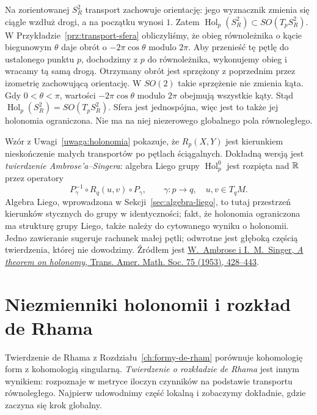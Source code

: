 \begin{przyklad}
\label{prz:holonomia-sfera}
Na zorientowanej $S_R^2$ transport zachowuje orientację:
jego wyznacznik zmienia się ciągle wzdłuż drogi,
a na początku wynosi $1$. Zatem
$\operatorname{Hol}_p(S_R^2)\subset SO(T_pS_R^2)$.
W Przykładzie~\ref{prz:transport-sfera} obliczyliśmy,
że obieg równoleżnika o kącie biegunowym $\theta$ daje obrót
o $-2\pi\cos\theta$ modulo $2\pi$. Aby przenieść tę
pętlę do ustalonego punktu $p$, dochodzimy z $p$ do
równoleżnika, wykonujemy obieg i wracamy tą samą drogą.
Otrzymany obrót jest sprzężony z poprzednim przez
izometrię zachowującą orientację. W $SO(2)$ takie
sprzężenie nie zmienia kąta. Gdy $0<\theta<\pi$,
wartości $-2\pi\cos\theta$ modulo $2\pi$ obejmują
wszystkie kąty. Stąd
$\operatorname{Hol}_p(S_R^2)=SO(T_pS_R^2)$.
Sfera jest jednospójna, więc jest to także jej
holonomia ograniczona. Nie ma na niej niezerowego
globalnego pola równoległego.
\end{przyklad}

\begin{uwaga}
\label{uwaga:ambrose-singer-holonomia}
Wzór z Uwagi~\ref{uwaga:holonomia} pokazuje, że
$R_p(X,Y)$ jest kierunkiem nieskończenie małych
transportów po pętlach ściągalnych. Dokładną wersją
jest \emph{twierdzenie Ambrose'a--Singera}:
algebra Liego grupy $\operatorname{Hol}^0_p$ jest
rozpięta nad $\mathbb{R}$ przez operatory
\[
 P_\gamma^{-1}\circ R_q(u,v)\circ P_\gamma,
 \qquad \gamma:p\longrightarrow q,\quad
 u,v\in T_qM.
\]
Algebra Liego, wprowadzona w Sekcji~\ref{sec:algebra-liego},
to tutaj przestrzeń kierunków stycznych do grupy
w identyczności; fakt, że holonomia ograniczona ma
strukturę grupy Liego, także należy do cytowanego
wyniku o holonomii. Jedno zawieranie sugeruje rachunek małej
pętli; odwrotne jest głęboką częścią twierdzenia, której
nie dowodzimy. Źródłem jest
\href{https://doi.org/10.1090/S0002-9947-1953-0063739-1}
{W.~Ambrose i I.~M.~Singer, \emph{A theorem on holonomy},
Trans. Amer. Math. Soc. 75 (1953), 428--443}.
\end{uwaga}

\section{Niezmienniki holonomii i rozkład de Rhama}
\label{sec:rozklad-de-rhama}

Twierdzenie de Rhama z Rozdziału~\ref{ch:formy-de-rham}
porównuje kohomologię form z kohomologią singularną.
\emph{Twierdzenie o rozkładzie de Rhama} jest innym
wynikiem: rozpoznaje w metryce iloczyn czynników na
podstawie transportu równoległego. Najpierw udowodnimy
część lokalną i zobaczymy dokładnie, gdzie zaczyna się
krok globalny.

